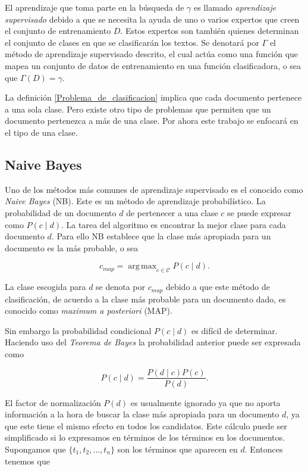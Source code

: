 \documentclass{llncs}
\DeclareMathOperator*{\argmax}{arg\,max}
\begin{document}
	El aprendizaje que toma parte en la b\'usqueda de $\gamma$ es llamado \emph{aprendizaje supervisado} debido a que se necesita la ayuda de uno o varios expertos que creen el conjunto de entrenamiento $D$. Estos expertos son  tambi\'en quienes determinan el conjunto de clases en que se clasificar\'an los textos. Se denotar\'a  por $\Gamma$ el m\'etodo de aprendizaje supervisado descrito, el cual act\'ua como una funci\'on que mapea un conjunto de datos de entrenamiento en una funci\'on clasificadora, o sea que $\Gamma(D) = \gamma$.
	
	La definici\'on \ref{Problema_de_clasificacion} implica que cada documento pertenece a una sola clase. Pero existe otro tipo de problemas que permiten que un documento pertenezca a m\'as de una clase. Por ahora este trabajo se enfocar\'a en el tipo de una clase.
	


	\subsection{Naive Bayes}

		Uno de los m\'etodos m\'as comunes de aprendizaje supervisado es el conocido como \emph{Naive Bayes} (NB). Este es un m\'etodo de aprendizaje probabil\'istico. La probabilidad de un documento $d$ de pertenecer a una clase $c$ se puede expresar como $P(c\mid d)$. La tarea del algoritmo es encontrar la mejor clase para cada documento $d$. Para ello NB establece que la clase m\'as apropiada para un documento es la m\'as probable, o sea
		
		\[
		c_{map} = \argmax_{c\in\mathcal{C}} P(c \mid d).
		\]
		
		La clase escogida para $d$ se denota por $c_{map}$ debido a que este m\'etodo de clasificaci\'on, de acuerdo a la clase m\'as probable para un documento dado, es conocido como \emph{maximum a posteriori} (MAP).
		
		Sin embargo la probabilidad condicional $P(c \mid d)$ es dif\'icil de determinar. Haciendo uso del \emph{Teorema de Bayes} la probabilidad anterior puede ser expresada como
		
		\[
		P(c \mid d) =\frac{ P(d\mid c) P(c)}{P(d)}.
		\]
		
		El factor de normalizaci\'on $P(d)$ es usualmente ignorado ya que no aporta informaci\'on a la hora de buscar la clase m\'as apropiada para un documento $d$, ya que este tiene el mismo efecto en todos los candidatos. Este c\'alculo puede ser simplificado si lo expresamos en t\'erminos de los t\'erminos en los documentos. Supongamos que $\{t_1, t_2, \dots , t_n \}$ son los t\'erminos que aparecen en $d$. Entonces tenemos que  
		
\end{document}
